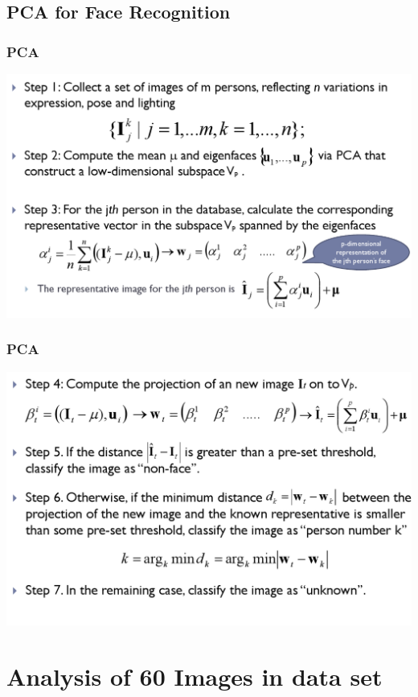 \documentclass[11pt]{beamer}
\begin{document}
\subsection{PCA for Face Recognition}
\begin{frame}
\frametitle{PCA}
\includegraphics[width=\textwidth]{PCA3.png}
\end{frame}
\begin{frame}
\frametitle{PCA}
\includegraphics[width=\textwidth]{PCA4.png}
\end{frame}

\section{Analysis of 60 Images in data set}
\end{document}
